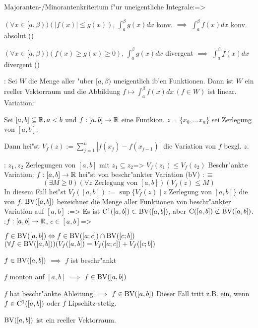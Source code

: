 \theorem Majoranten-/Minoranten\-kriterium f"ur uneigentliche Integrale:=>{
  \begin{stmts}
    \item $(\forall x \in[a,\beta))(|f(x)|\le g(x))$, 
      $\int_a^\beta g(x)dx$ konv.
      $\implies$ $\int_a^\beta f(x)dx$ konv. absolut
      (\emph{})
    \item $(\forall x \in[a,\beta))(f(x)\ge g(x)\ge 0)$, 
      $\int_a^\beta g(x)dx$ divergent 
      $\implies$ $\int_a^\beta f(x)dx$ divergent
      (\emph{})
    \end{stmts}
  }
\remark:{
  Sei $ W$ die Menge aller "uber $[a,\beta)$ uneigentlich ib'en 
  Funktionen. Dann ist $ W$ ein reeller Vektorraum und die 
  Abbildung $f\mapsto\int_a^\beta f(x)dx\,(f\in W)$ ist linear.
  }
 Variation:{
  Sei $[a,b]\subseteq\mathbb R,a<b$ und $f:[a,b]\to\mathbb R$ eine Funtkion.
  $z=\{x_0,...x_n\}$ sei Zerlegung von $[a,b]$.
  
  Dann hei"st $V_f(z):=\sum_{j=1}^n |f(x_j)-f(x_{j-1})|$ die Variation
  von $f$ bezgl. $z$.
  }
\lessertheorem:
  $z_1,z_2$ Zerlegungen von $[a,b]$ mit $z_1\subseteq z_2$=>{
  $V_f(z_1)\le V_f(z_2)$
  }
 Beschr"ankte Variation:{
  $f:[a,b]\to\mathbb R$ hei"st von beschr"ankter Variation (bV) $:\equiv$
  \[(\exists M\ge 0)(\forall z \text{ Zerlegung von $[a,b]$})(V_f(z)\le M)
    \]
  In diesem Fall hei"st 
  $V_f([a,b]):=\sup \{V_f(z)\mid z \text{ Zerlegung von $[a,b]$}\}$
  die  von $f$.
  ${\rm BV}([a,b])$ bezeichnet die Menge aller Funktionen von beschr"ankter
  Variation auf $[a,b]$
}
\lessertheorem:=>{
  Es ist ${\rm C}^1([a,b])\subset {\rm BV}([a,b])$, aber
  ${\rm C}([a,b])\not\subset {\rm BV}([a,b])$.
  }
\theorem:$f:[a,b]\to\mathbb R$, $c\in[a,b]$=>{
  \begin{stmts}
    \item $f\in{\rm BV}([a,b])\Leftrightarrow f\in{\rm BV}([a;c])\cap{\rm BV}([c;b])$
      $(\forall f\in{\rm BV}([a,b]))(V_f([a,b])=V_f([a;c])+V_f([c;b])$ 
    \item $f\in{\rm BV}([a,b])$ $\implies$ $f$ ist beschr"ankt 
    \item $f$ monton auf $[a,b]$ $\implies$ $f\in{\rm BV}([a,b])$ 
    \item $f$ hat beschr"ankte Ableitung $\implies$ $f\in{\rm BV}([a,b])$ 
      Dieser Fall tritt z.B. ein, wenn $f\in{\rm C}^1([a,b])$ oder $f$ 
      Lipschitz-stetig.
    \item ${\rm BV}([a,b])$ ist ein reeller Vektorraum.
    \end{stmts}
  }
